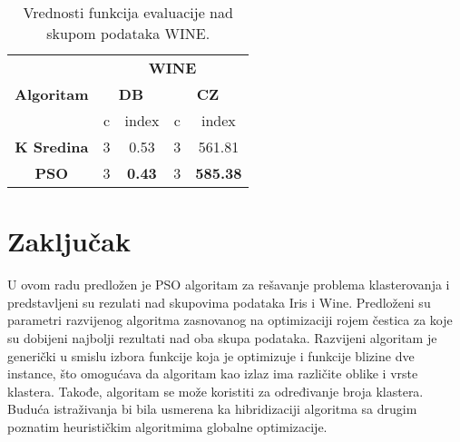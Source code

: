 \documentclass[a4paper,serbian]{symopissr}
\begin{document}
\begin{table}[h!]
\begin{tabular}{|l|c|c|c|c|}
\hline
\multirow{3}{*}{\textbf{Algoritam}}      & \multicolumn{4}{c|}{\textbf{WINE}}                                        \\ \cline{2-5} 
                                         & \multicolumn{2}{c|}{\textbf{DB}} & \multicolumn{2}{c|}{\textbf{CZ}} \\ \cline{2-5} 
                                         & c         & index                & c & index                                \\ \hline
\multicolumn{1}{|c|}{\textbf{K Sredina}} & 3         & 0.53                & 3 & 561.81                               \\ \hline
\multicolumn{1}{|c|}{\textbf{PSO}}       & 3         & \textbf{0.43}        & 3 & \multicolumn{1}{l|}{\textbf{585.38}} \\ \hline
\end{tabular}
\caption{\label{tab:wine}Vrednosti funkcija evaluacije nad skupom podataka WINE.}
\end{table}

\section{Zaključak}
\label{sec:zakljucak}
U ovom radu predložen je PSO algoritam za rešavanje problema klasterovanja i predstavljeni su rezulati nad skupovima podataka Iris i Wine. Predloženi su parametri razvijenog algoritma zasnovanog na optimizaciji rojem čestica za koje su dobijeni najbolji rezultati nad oba skupa podataka. Razvijeni algoritam je generički u smislu izbora funkcije koja je optimizuje i funkcije blizine dve instance, što omogućava da algoritam kao izlaz ima različite oblike i vrste klastera. Takođe, algoritam se može koristiti za određivanje broja klastera.\\
Buduća istraživanja bi bila usmerena ka hibridizaciji algoritma sa drugim poznatim heurističkim algoritmima globalne optimizacije.

\end{document}
